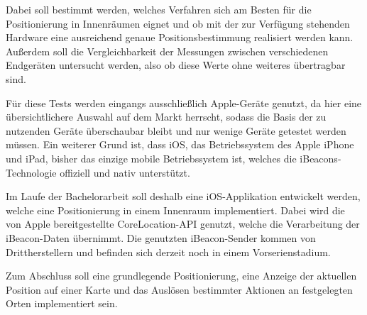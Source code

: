 Dabei soll bestimmt werden, welches Verfahren sich am Besten für die Positionierung in Innenräumen eignet und ob mit der zur Verfügung stehenden Hardware eine ausreichend genaue Positionsbestimmung realisiert werden kann. Außerdem soll die Vergleichbarkeit der Messungen zwischen verschiedenen Endgeräten untersucht werden, also ob diese Werte ohne weiteres übertragbar sind.

Für diese Tests werden eingangs ausschließlich Apple-Geräte genutzt, da hier eine übersichtlichere Auswahl auf dem Markt herrscht, sodass die Basis der zu nutzenden Geräte überschaubar bleibt und nur wenige Geräte getestet werden müssen. Ein weiterer Grund ist, dass iOS, das Betriebssystem des Apple iPhone und iPad, bisher das einzige mobile Betriebssystem ist, welches die iBeacons-Technologie offiziell und nativ unterstützt.

Im Laufe der Bachelorarbeit soll deshalb eine iOS-Applikation entwickelt werden, welche eine Positionierung in einem Innenraum implementiert. Dabei wird die von Apple bereitgestellte CoreLocation-API genutzt, welche die Verarbeitung der iBeacon-Daten übernimmt. Die genutzten iBeacon-Sender kommen von Drittherstellern und befinden sich derzeit noch in einem Vorserienstadium. 

Zum Abschluss soll eine grundlegende Positionierung, eine Anzeige der aktuellen Position auf einer Karte und das Auslösen bestimmter Aktionen an festgelegten Orten implementiert sein.


